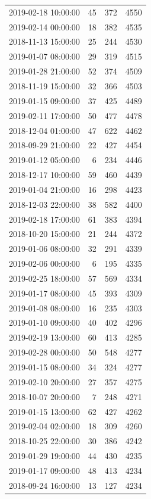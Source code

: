 \begin{tabular}{lrrr}
2019-02-18 10:00:00 & 45 & 372 & 4550 \\
2019-02-14 00:00:00 & 18 & 382 & 4535 \\
2018-11-13 15:00:00 & 25 & 244 & 4530 \\
2019-01-07 08:00:00 & 29 & 319 & 4515 \\
2019-01-28 21:00:00 & 52 & 374 & 4509 \\
2018-11-19 15:00:00 & 32 & 366 & 4503 \\
2019-01-15 09:00:00 & 37 & 425 & 4489 \\
2019-02-11 17:00:00 & 50 & 477 & 4478 \\
2018-12-04 01:00:00 & 47 & 622 & 4462 \\
2018-09-29 21:00:00 & 22 & 427 & 4454 \\
2019-01-12 05:00:00 & 6 & 234 & 4446 \\
2018-12-17 10:00:00 & 59 & 460 & 4439 \\
2019-01-04 21:00:00 & 16 & 298 & 4423 \\
2018-12-03 22:00:00 & 38 & 582 & 4400 \\
2019-02-18 17:00:00 & 61 & 383 & 4394 \\
2018-10-20 15:00:00 & 21 & 244 & 4372 \\
2019-01-06 08:00:00 & 32 & 291 & 4339 \\
2019-02-06 00:00:00 & 6 & 195 & 4335 \\
2019-02-25 18:00:00 & 57 & 569 & 4334 \\
2019-01-17 08:00:00 & 45 & 393 & 4309 \\
2019-01-08 08:00:00 & 16 & 235 & 4303 \\
2019-01-10 09:00:00 & 40 & 402 & 4296 \\
2019-02-19 13:00:00 & 60 & 413 & 4285 \\
2019-02-28 00:00:00 & 50 & 548 & 4277 \\
2019-01-15 08:00:00 & 34 & 324 & 4277 \\
2019-02-10 20:00:00 & 27 & 357 & 4275 \\
2018-10-07 20:00:00 & 7 & 248 & 4271 \\
2019-01-15 13:00:00 & 62 & 427 & 4262 \\
2019-02-04 02:00:00 & 18 & 309 & 4260 \\
2018-10-25 22:00:00 & 30 & 386 & 4242 \\
2019-01-29 19:00:00 & 44 & 430 & 4235 \\
2019-01-17 09:00:00 & 48 & 413 & 4234 \\
2018-09-24 16:00:00 & 13 & 127 & 4234 \\

\end{tabular}
